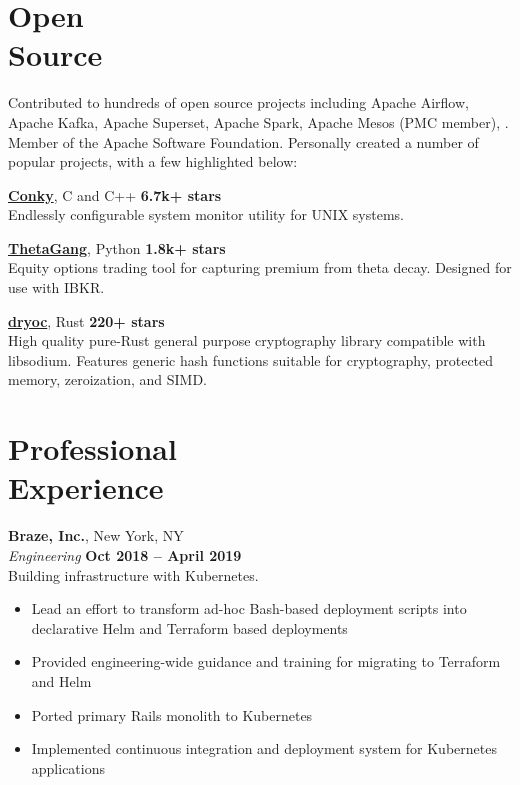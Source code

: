 \documentclass[margin,line]{resume}
\begin{document}
\begin{resume}
    \section{\mysidestyle Open\\Source}

    Contributed to hundreds of open source projects including Apache Airflow,
    Apache Kafka, Apache Superset, Apache Spark, Apache Mesos (PMC member), . Member of the
    Apache Software Foundation. Personally created a number of popular projects,
    with a few highlighted below:

    \href{https://github.com/brndnmtthws/conky}{\textbf{Conky}}, C and C++ \hfill \textbf{6.7k+ stars}\\
    Endlessly configurable system monitor utility for UNIX systems.

    \href{https://github.com/brndnmtthws/thetagang}{\textbf{ThetaGang}}, Python \hfill \textbf{1.8k+ stars}\\
    Equity options trading tool for capturing premium from theta decay. Designed
    for use with IBKR.

    \href{https://github.com/brndnmtthws/dryoc}{\textbf{dryoc}}, Rust \hfill \textbf{220+ stars}\\
    High quality pure-Rust general purpose cryptography library compatible with
    libsodium.  Features generic hash functions suitable for cryptography,
    protected memory, zeroization, and SIMD.

    \vspace{3mm}

    \section{\mysidestyle Professional\\Experience}

    \textbf{Braze, Inc.}, New York, NY \vspace{2mm}\\\vspace{1mm}%
    \textsl{Engineering} \hfill \textbf{Oct 2018 -- April 2019}\\
    Building infrastructure with Kubernetes.
    
    \begin{itemize}
        \item Lead an effort to transform ad-hoc Bash-based deployment scripts
        into declarative Helm and Terraform based deployments
        \item Provided engineering-wide guidance and training for migrating to
        Terraform and Helm
        \item Ported primary Rails monolith to Kubernetes
        \item Implemented continuous integration and deployment system for
        Kubernetes applications
    \end{itemize}


\end{resume}
\end{document}
